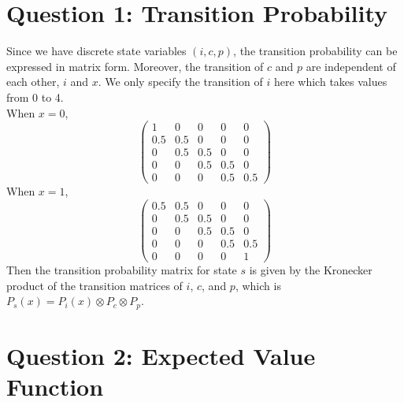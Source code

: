 \documentclass[12pt]{article}[margin=1in]
\begin{document}
\section{Question 1: Transition Probability}
Since we have discrete state variables $(i,c,p)$, the transition probability
can be expressed in matrix form. Moreover, the transition of $c$ and $p$ are
independent of each other, $i$ and $x$. We only specify the transition of $i$
here which takes values from 0 to 4. \\ When $x = 0$,
\begin{equation}\label{eq:trans0}
    \begin{pmatrix}
        1   & 0   & 0   & 0   & 0   \\
        0.5 & 0.5 & 0   & 0   & 0   \\
        0   & 0.5 & 0.5 & 0   & 0   \\
        0   & 0   & 0.5 & 0.5 & 0   \\
        0   & 0   & 0   & 0.5 & 0.5
    \end{pmatrix}
\end{equation}
When $x = 1$,
\begin{equation}\label{eq:trans1}
    \begin{pmatrix}
        0.5 & 0.5 & 0   & 0   & 0   \\
        0   & 0.5 & 0.5 & 0   & 0   \\
        0   & 0   & 0.5 & 0.5 & 0   \\
        0   & 0   & 0   & 0.5 & 0.5 \\
        0   & 0   & 0   & 0   & 1
    \end{pmatrix}
\end{equation}
Then the transition probability matrix for state $s$ is given by the Kronecker product of the transition matrices of $i$, $c$, and $p$, which is $P_s(x) = P_i(x) \otimes P_c \otimes P_p$.
\section{Question 2: Expected Value Function}
\end{document}
